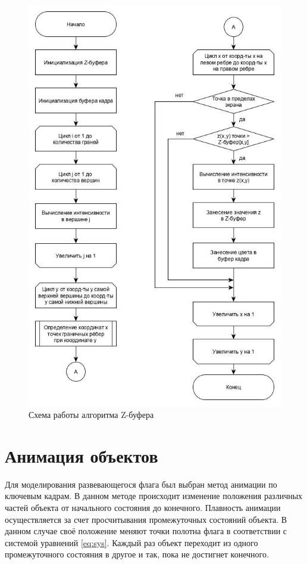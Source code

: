 \begin{figure}[ht!]
	\centering
	\includegraphics[scale=0.65]{zbuffer_scheme.jpg}
	\caption{Схема работы алгоритма Z-буфера}
	\label{fig:zbufferflow}
\end{figure}

\pagebreak

\section{Анимация объектов}
\hspace{0.6cm}Для моделирования развевающегося флага был выбран метод анимации по ключевым кадрам. В данном методе происходит изменение положения различных частей объекта от начального состояния до конечного. Плавность анимации осуществляется за счет просчитывания промежуточных состояний объекта. В данном случае своё положение меняют точки полотна флага в соответствии с системой уравнений \ref{eq:sys}. Каждый раз объект переходит из одного промежуточного состояния в другое и так, пока не достигнет конечного.

